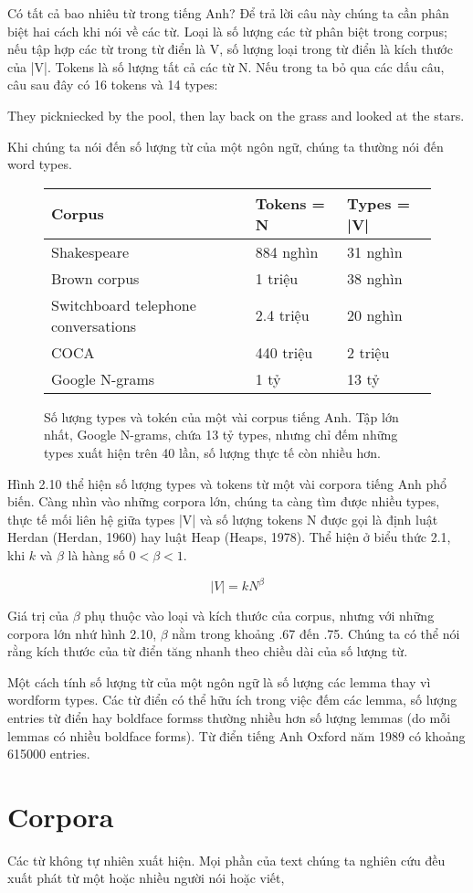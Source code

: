 Có tất cả bao nhiêu từ trong tiếng Anh? Để trả lời câu này chúng ta cần phân biệt hai cách khi nói về các từ. Loại là số lượng các từ phân biệt trong corpus; nếu tập hợp các từ trong từ điển là V, số lượng loại trong từ điển là kích thước của |V|. Tokens là số lượng tất cả các từ N. Nếu trong ta bỏ qua các dấu câu, câu sau đây có 16 tokens và 14 types:

They pickniecked by the pool, then lay back on the grass and looked at the stars.

Khi chúng ta nói đến số lượng từ của một ngôn ngữ, chúng ta thường nói đến word types.

\begin{figure}[h]
	\begin{tabular}{ l l l }
	 \hline
	 Corpus & Tokens = N & Types = |V| \\
	 \hline
	 Shakespeare & 884 nghìn & 31 nghìn \\
	 Brown corpus & 1 triệu & 38 nghìn \\
	 Switchboard telephone conversations & 2.4 triệu & 20 nghìn \\
	 COCA & 440 triệu & 2 triệu \\
	 Google N-grams & 1 tỷ & 13 tỷ
	 \hline
	\end{tabular}
 \caption{Số lượng types và tokén của một vài corpus tiếng Anh. Tập lớn nhất, Google N-grams, chứa 13 tỷ types, nhưng chỉ đếm những types xuất hiện trên 40 lần, số lượng thực tế còn nhiều hơn.}
 \label{table:1}
\end{figure}

Hình 2.10 thể hiện số lượng types và tokens từ một vài corpora tiếng Anh phổ biến. Càng nhìn vào những corpora lớn, chúng ta càng tìm được nhiều types, thực tế mối liên hệ giữa types |V| và số lượng tokens N được gọi là định luật Herdan (Herdan, 1960) hay luật Heap (Heaps, 1978). Thể hiện ở biểu thức 2.1, khi $k$ và $\beta$ là hàng số $0 < \beta < 1$.

\begin{equation} \label{}
|V| = kN^{\beta}
\end{equation}

Giá trị của $\beta$ phụ thuộc vào loại và kích thước của corpus, nhưng với những corpora lớn nhứ hình 2.10, $\beta$ nằm trong khoảng .67 đến .75.  Chúng ta có thể nói rằng kích thước của từ điển tăng nhanh theo chiều dài của số lượng từ.

Một cách tính số lượng từ của một ngôn ngữ là số lượng các lemma thay vì wordform types. Các từ điển có thể hữu ích trong việc đếm các lemma, số lượng entries từ điển hay boldface formss thường nhiều hơn số lượng lemmas (do mỗi lemmas có nhiều boldface forms). Từ điển tiếng Anh Oxford năm 1989 có khoảng 615000 entries.

\section{Corpora}

Các từ không tự nhiên xuất hiện. Mọi phần của text chúng ta nghiên cứu đều xuất phát từ một hoặc nhiều người nói hoặc viết,